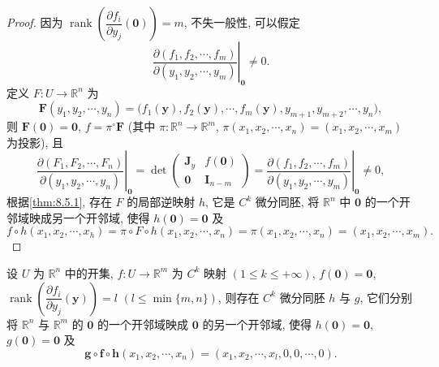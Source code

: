 \begin{proof}
因为 $\operatorname{rank}\left(\dfrac{\partial f_{i}}{\partial y_{j}}(\boldsymbol{0})\right) = m$, 不失一般性, 可以假定
\[
  \left.\frac{\partial(f_{1}, f_{2}, \cdots, f_{m})}{\partial(y_{1}, y_{2}, \cdots, y_{m})}\right|_{\boldsymbol{0}} \neq 0.
\]
定义 $F: U \to \mathbb{R}^{n}$ 为
\[
  \boldsymbol{F}(y_{1}, y_{2}, \cdots, y_{n}) = \bigl(f_{1}(\boldsymbol{y}), f_{2}(\boldsymbol{y}), \cdots, f_{m}(\boldsymbol{y}), y_{m+1}, y_{m+2}, \cdots, y_{n}\bigr),
\]
则 $\boldsymbol{F}(\boldsymbol{0}) = \boldsymbol{0}$, $f = \pi^{\circ} \boldsymbol{F}$ (其中 $\pi: \mathbb{R}^{n} \to \mathbb{R}^{m}$, $\pi(x_{1}, x_{2}, \cdots, x_{n}) = (x_{1}, x_{2}, \cdots, x_{m})$ 为投影), 且
\[
  \left.\frac{\partial(F_{1}, F_{2}, \cdots, F_{n})}{\partial(y_{1}, y_{2}, \cdots, y_{n})}\right|_{\boldsymbol{0}} = \det\begin{pmatrix}
    \boldsymbol{J}_{y} & f(\boldsymbol{0}) \\
    \boldsymbol{0} & \boldsymbol{I}_{n-m}
  \end{pmatrix} = \left.\frac{\partial(f_{1}, f_{2}, \cdots, f_{m})}{\partial(y_{1}, y_{2}, \cdots, y_{m})}\right|_{\boldsymbol{0}} \neq 0,
\]
根据\cref{thm:8.5.1}, 存在 $F$ 的局部逆映射 $h$, 它是 $C^{k}$ 微分同胚, 将 $\mathbb{R}^{n}$ 中 $\boldsymbol{0}$ 的一个开邻域映成另一个开邻域, 使得 $h(\boldsymbol{0}) = \boldsymbol{0}$ 及
\[
  f \circ h(x_{1}, x_{2}, \cdots, x_{h}) = \pi \circ F \circ h(x_{1}, x_{2}, \cdots, x_{n}) = \pi(x_{1}, x_{2}, \cdots, x_{n}) = (x_{1}, x_{2}, \cdots, x_{m}).
\]
\end{proof}

\begin{corollary}\label{cor:8.5.3}
设 $U$ 为 $\mathbb{R}^{n}$ 中的开集, $f: U \to \mathbb{R}^{m}$ 为 $C^{k}$ 映射 $(1 \leqslant k \leqslant +\infty)$, $f(\boldsymbol{0}) = \boldsymbol{0}$, $\operatorname{rank}\left(\dfrac{\partial f_{i}}{\partial y_{j}}(\boldsymbol{y})\right) = l$ $(l \leqslant \min\{m, n\})$, 则存在 $C^{k}$ 微分同胚 $h$ 与 $g$, 它们分别将 $\mathbb{R}^{n}$ 与 $\mathbb{R}^{m}$ 的 $\boldsymbol{0}$ 的一个开邻域映成 $\boldsymbol{0}$ 的另一个开邻域, 使得 $h(\boldsymbol{0}) = \boldsymbol{0}$, $g(\boldsymbol{0}) = \boldsymbol{0}$ 及
\[
  \boldsymbol{g} \circ \boldsymbol{f} \circ \boldsymbol{h}(x_{1}, x_{2}, \cdots, x_{n}) = (x_{1}, x_{2}, \cdots, x_{l}, 0, 0, \cdots, 0).
\]
\end{corollary}

